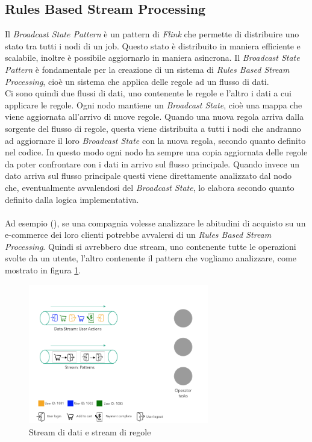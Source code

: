 \subsection{Rules Based Stream Processing}
\label{subsec:RulesBasedStreamProcessing}
Il \textit{Broadcast State Pattern} è un pattern di \textit{Flink} che permette di distribuire uno stato tra tutti i nodi di un job.
Questo stato è distribuito in maniera efficiente e scalabile, inoltre è possibile aggiornarlo in maniera asincrona.
Il \textit{Broadcast State Pattern} è fondamentale per la creazione di un sistema di \textit{Rules Based Stream Processing}, 
cioè un sistema che applica delle regole ad un flusso di dati.\\
Ci sono quindi due flussi di dati, uno contenente le regole e l'altro i dati a cui applicare le regole.
Ogni nodo mantiene un \textit{Broadcast State}, cioè una mappa che viene aggiornata all'arrivo di nuove regole.
Quando una nuova regola arriva dalla sorgente del flusso di regole, questa viene distribuita a tutti i nodi che andranno ad aggiornare il loro \textit{Broadcast State}
con la nuova regola, secondo quanto definito nel codice. In questo modo ogni nodo ha sempre una copia aggiornata delle regole da poter confrontare con i dati in arrivo sul flusso principale.
Quando invece un dato arriva sul flusso principale questi viene direttamente analizzato dal nodo che, eventualmente avvalendosi del \textit{Broadcast State}, lo elabora 
secondo quanto definito dalla logica implementativa.\\\\
Ad esempio (), se una compagnia volesse analizzare le abitudini di acquisto su un e-commerce dei loro clienti 
potrebbe avvalersi di un \textit{Rules Based Stream Processing}. Quindi si avrebbero due stream, uno contenente tutte le operazioni svolte da un utente,
l'altro contenente il pattern che vogliamo analizzare, come mostrato in figura \ref{fig:broadcastState1}.
\begin{figure}[H]
    \centering
    \includegraphics[width=0.7\textwidth]{images/EventExport/broadcastState1.png}
    \caption{Stream di dati e stream di regole}
    \label{fig:broadcastState1}
\end{figure}

